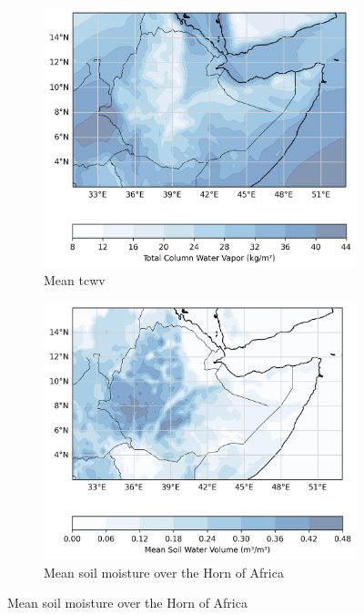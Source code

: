 \begin{figure}[ht]
\centering
\begin{subfigure}[t]{0.45\textwidth}
    \includegraphics[width=\textwidth]{../figures/generated/exploration/mean_tcwv.png}
    \caption{Mean \acrfull{tcwv}}
    \label{fig:mean_tcwv}
\end{subfigure}
\hfill
\begin{subfigure}[t]{0.45\textwidth}
    \includegraphics[width=\textwidth]{../figures/generated/exploration/mean_swvl1.png}
    \caption{Mean soil moisture over the Horn of Africa}

\end{subfigure}
\end{figure}
